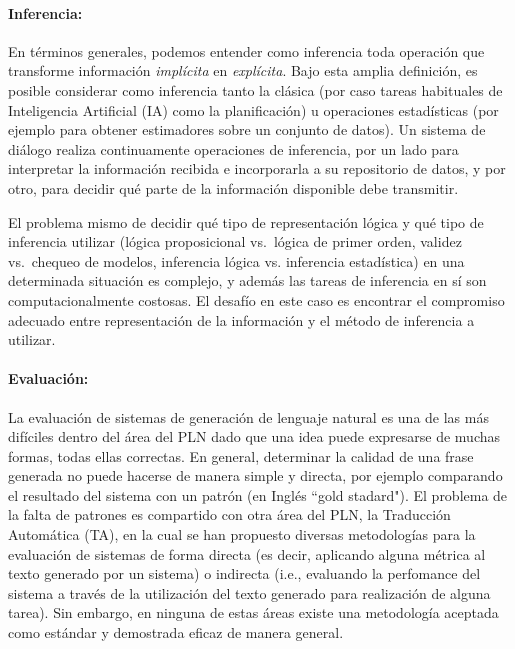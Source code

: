   \paragraph{Inferencia:} En t\'erminos generales, podemos entender como
  inferencia toda operaci\'on que transforme informaci\'on \textit{impl\'icita} en
  \textit{expl\'icita}.  Bajo esta amplia definici\'on, es posible considerar como
  inferencia tanto la cl\'asica (por caso
  tareas habituales de Inteligencia Artificial (IA) como la planificaci\'on) u operaciones estad\'isticas (por ejemplo para obtener estimadores sobre un conjunto de datos).  Un sistema de di\'alogo realiza continuamente operaciones de inferencia, por un lado   para interpretar la informaci\'on recibida e incorporarla a su repositorio de datos, y por otro, para decidir qu\'e parte de la informaci\'on disponible debe transmitir.

  El problema mismo de decidir qu\'e tipo de representaci\'on l\'ogica y qu\'e tipo de inferencia utilizar (l\'ogica proposicional vs.\ l\'ogica de primer orden, validez vs.\ chequeo de modelos, inferencia l\'ogica vs. inferencia estad\'istica) en una determinada situaci\'on  es complejo, y adem\'as las tareas de inferencia en s\'i son computacionalmente costosas.  El desaf\'io en este caso es encontrar el compromiso adecuado entre representaci\'on de la informaci\'on y el m\'etodo de inferencia a utilizar.

\paragraph{Evaluaci\'on:} La evaluaci\'on de sistemas de generaci\'on de lenguaje natural es una de las m\'as dif\'iciles dentro del \'area del PLN dado que una idea puede expresarse de muchas formas, todas ellas correctas. En general, determinar la calidad de una frase generada no puede hacerse de manera simple y directa, por ejemplo comparando el resultado del sistema con un patr\'on (en Ingl\'es ``gold stadard"). El problema de la falta de patrones es compartido con otra \'area del PLN, la Traducci\'on Autom\'atica (TA), en la cual se han propuesto diversas metodolog\'ias para la evaluaci\'on de sistemas de forma directa (es decir, aplicando alguna m\'etrica al texto generado por un sistema) o indirecta (i.e., evaluando la perfomance del sistema a trav\'es de la utilizaci\'on del texto generado para realizaci\'on de alguna tarea). Sin embargo, en ninguna de estas \'areas existe una metodolog\'ia aceptada como est\'andar y demostrada eficaz de manera general.

